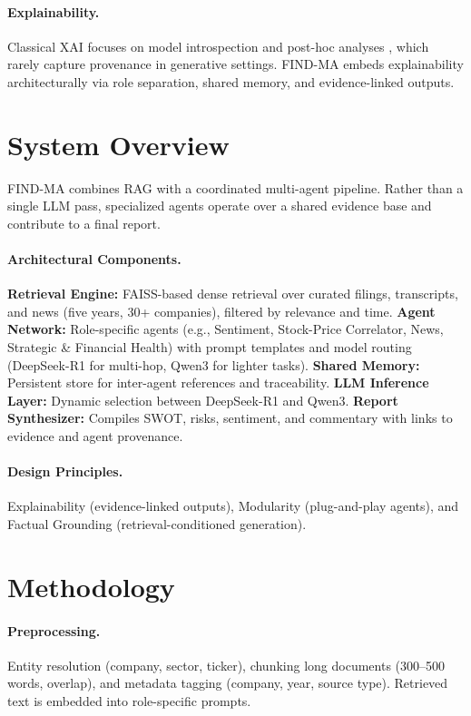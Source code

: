 \documentclass[11pt]{article}
\newcommand{\findma}{\textsc{FIND-MA}}
\begin{document}
\paragraph{Explainability.}
Classical XAI focuses on model introspection and post-hoc analyses \citep{arrieta2020explainable}, which rarely capture provenance in generative settings. \findma{} embeds explainability architecturally via role separation, shared memory, and evidence-linked outputs.

\section{System Overview}
\label{sec:overview}
\findma{} combines RAG with a coordinated multi-agent pipeline. Rather than a single LLM pass, specialized agents operate over a shared evidence base and contribute to a final report.

\paragraph{Architectural Components.}
\textbf{Retrieval Engine:} FAISS-based dense retrieval over curated filings, transcripts, and news (five years, 30+ companies), filtered by relevance and time. 
\textbf{Agent Network:} Role-specific agents (e.g., Sentiment, Stock-Price Correlator, News, Strategic \& Financial Health) with prompt templates and model routing (DeepSeek-R1 for multi-hop, Qwen3 for lighter tasks).
\textbf{Shared Memory:} Persistent store for inter-agent references and traceability.
\textbf{LLM Inference Layer:} Dynamic selection between DeepSeek-R1 and Qwen3.
\textbf{Report Synthesizer:} Compiles SWOT, risks, sentiment, and commentary with links to evidence and agent provenance.

\paragraph{Design Principles.}
Explainability (evidence-linked outputs), Modularity (plug-and-play agents), and Factual Grounding (retrieval-conditioned generation).

\section{Methodology}
\label{sec:methodology}
\paragraph{Preprocessing.}
Entity resolution (company, sector, ticker), chunking long documents (300--500 words, overlap), and metadata tagging (company, year, source type). Retrieved text is embedded into role-specific prompts.
\end{document}
